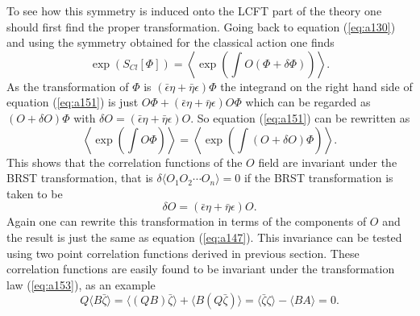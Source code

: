 \documentclass[a4paper,11pt]{article}
\begin{document}
To see how this symmetry is induced onto the LCFT part of the
theory one should first find the proper transformation. Going back
to equation (\ref{eq:a130}) and using the symmetry obtained for
the classical action one finds
\begin{equation}\label{eq:a151}
\exp(S_{Cl}[\Phi])= \left\langle\exp \left(\int O(\Phi+
\delta\Phi)\right) \right\rangle.
\end{equation}
As the transformation of $\Phi$ is $(\bar{\epsilon}\eta +
\bar{\eta}\epsilon)\Phi$ the integrand on the right hand side of
equation (\ref{eq:a151}) is just $O\Phi+(\bar{\epsilon}\eta +
\bar{\eta}\epsilon)O\Phi$ which can be regarded as $(O+\delta
O)\Phi$ with $\delta O=(\bar{\epsilon}\eta +
\bar{\eta}\epsilon)O$. So equation (\ref{eq:a151}) can be
rewritten as
\begin{equation}\label{eq:a152}
\left\langle\exp\left(\int O\Phi\right)\right\rangle=
\left\langle\exp\left(\int(O+\delta O) \Phi\right)\right\rangle.
\end{equation}
This shows that the correlation functions of the $O$ field are
invariant under the BRST transformation, that is $\delta\langle
O_1O_2\cdots O_n\rangle=0$ if the BRST transformation is taken to
be
\begin{equation}\label{eq:a153}
\delta O=(\bar{\epsilon}\eta + \bar{\eta}\epsilon)O.
\end{equation}
Again one can rewrite this transformation in terms of the
components of $O$ and the result is just the same as equation
(\ref{eq:a147}). This invariance can be tested using two point
correlation functions derived in previous section. These
correlation functions are easily found to be invariant under the
transformation law (\ref{eq:a153}), as an example
\begin{equation}\label{eq:a154}
Q \langle B \bar{\zeta}\rangle= \langle (Q B) \bar{\zeta}\rangle+
\langle B (Q \bar{\zeta}) \rangle= \langle\bar{\zeta}\zeta\rangle
- \langle BA\rangle=0.
\end{equation}
\end{document}
